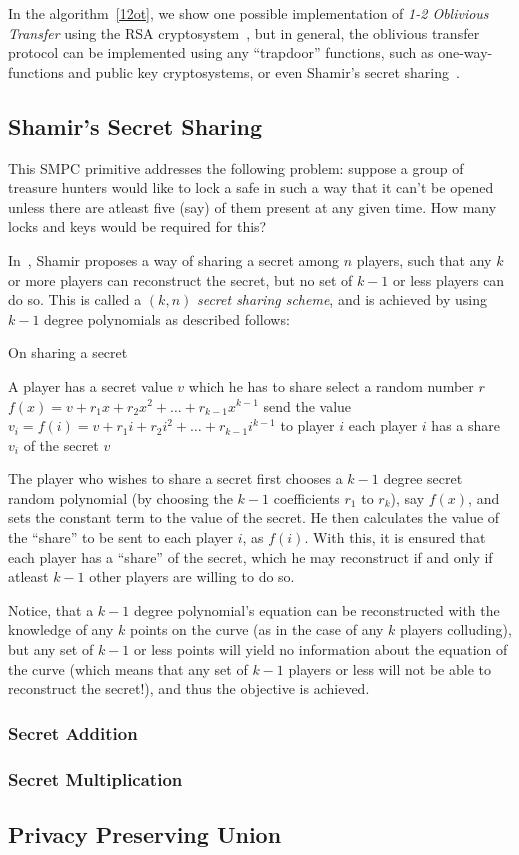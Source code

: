 In the algorithm~\ref{12ot}, we show one possible implementation of 
\emph{1-2 Oblivious Transfer} using the RSA cryptosystem~\cite{RSA78:AMfODSaPKC},
	but in general, the oblivious transfer protocol can be implemented using
	any ``trapdoor'' functions, such as one-way-functions and public key
	cryptosystems, or even Shamir's secret sharing~\cite{SSR08:APfGOT}.

\subsection{Shamir's Secret Sharing}
\label{sec:sss-prim}
This SMPC primitive addresses the following problem: suppose a group of
treasure hunters would like to lock a safe in such a way that it can't 
be opened unless there are atleast five (say) of them present at any given time. 
How many locks and keys would be required for this?

In~\cite{S79:HtSaS}, Shamir proposes a way of sharing a secret among $n$ 
players, such that any $k$ or more players can reconstruct the secret,
but no set of $k-1$ or less players can do so. This is called a $(k,n)$ 
{\it secret sharing scheme}, and is achieved by using $k-1$ degree polynomials
as described follows: 

\begin{algorithm}
\caption{On sharing a secret}
\label{algshare}
\begin{algorithmic}
\REQUIRE A player has a secret value $v$ which he has to share
\STATE select a random number $r$
\STATE $f(x) = v + r_{1}x + r_{2}x^{2} + \ldots + r_{k-1}x^{k-1}$
	\STATE send the value $v_{i}= f(i) = v + r_{1}i + r_{2}i^{2} + \ldots + r_{k-1}i^{k-1}$ to player $i$
\ENDFOR
\ENSURE each player $i$ has a share $v_{i}$ of the secret $v$
\end{algorithmic}
\end{algorithm}

The player who wishes to share a secret first chooses a $k-1$ degree
secret random polynomial (by choosing the $k-1$ coefficients $r_1$ to $r_k$),
say $f(x)$,
and sets the constant term to the value of the secret. He then calculates
the value of the ``share'' to be sent to each player $i$, as $f(i)$. With
this, it is ensured that each player has a ``share'' of the secret, which
he may reconstruct if and only if atleast $k-1$ other players are willing
to do so.

Notice, that
a $k-1$ degree polynomial's equation can be reconstructed with the knowledge
of any $k$ points on the curve (as in the case of any $k$ players colluding),
but any set of $k-1$ or less points will yield no information
about the equation of the curve (which means that any set of $k-1$ players
or less will not be able to reconstruct the secret!), and thus the objective
is achieved.

\subsubsection{Secret Addition}
\label{sec:add-prim}

\subsubsection{Secret Multiplication}
\label{sec:mult-prim}

\subsection{Privacy Preserving Union}
\label{sec:union-prim}
